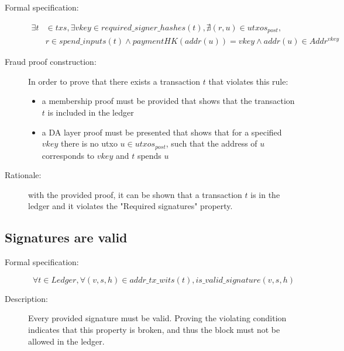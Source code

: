 \documentclass[../midgard.tex]{subfiles}
\begin{document}
\begin{description}

\item[Formal specification:]
\begin{equation*}
\begin{split}
    \exists t & \in txs, \exists vkey \in required\_signer\_hashes(t), \nexists (r, u) \in utxos_{post}, \\
    & r \in spend\_inputs(t) \land paymentHK(addr(u)) = vkey \land addr(u) \in Addr^{vkey}
\end{split}
\end{equation*}

\item[Fraud proof construction:] In order to prove that there exists a transaction $t$ that violates this rule:
\begin{itemize}
    \item a membership proof must be provided that shows that the transaction $t$ is included in the ledger
    \item a DA layer proof must be presented that shows that for a specified $vkey$ there is no utxo $u \in utxos_{post}$, such that the address of $u$ corresponds to $vkey$ and $t$ spends $u$
\end{itemize}

\item[Rationale:] with the provided proof, it can be shown that a transaction $t$ is in the ledger and it violates the "Required signatures" property.

\end{description}

\subsection{Signatures are valid}

\begin{description}

\item[Formal specification:]
\begin{equation*}
    \forall t \in Ledger, \forall (v, s, h) \in addr\_tx\_wits(t), is\_valid\_signature(v, s, h)
\end{equation*}
        
\item[Description:] Every provided signature must be valid.
  Proving the violating condition indicates that this property is broken, and thus the block must not be allowed in the ledger.
        
\end{description}
\end{document}
